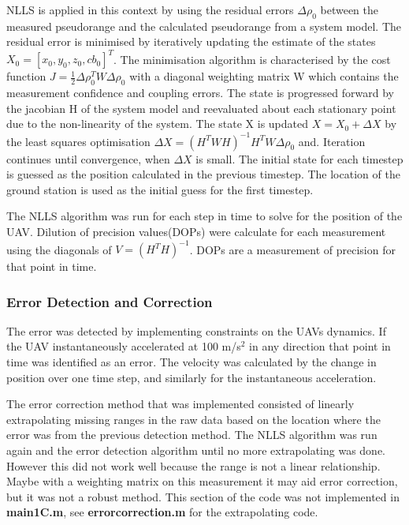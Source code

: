 \documentclass[Space3_Assign2]{subfile}
\begin{document}
NLLS is applied in this context by using the residual errors $\Delta\rho_0$ between the measured pseudorange and the calculated pseudorange from a system model. The residual error is minimised by iteratively updating the estimate of the states $X_0 = [x_0,y_0,z_0,cb_0]^T$. The minimisation algorithm is characterised by the cost function $J = \frac{1}{2}\Delta\rho_0^TW\Delta\rho_0$ with a diagonal weighting matrix W which contains the measurement confidence and coupling errors. The state is progressed forward by the jacobian H of the system model and reevaluated about each stationary point due to the non-linearity of the system. The state X is updated $X = X_0+\Delta X$ by the least squares optimisation $\Delta X = (H^TWH)^{-1}H^TW\Delta \rho_0$ and. Iteration continues until convergence, when $\Delta X$ is small. The initial state for each timestep is guessed as the position calculated in the previous timestep. The location of the ground station is used as the initial guess for the first timestep.

The NLLS algorithm was run for each step in time to solve for the position of the UAV. Dilution of precision values(DOPs) were calculate for each measurement using the diagonals of $V = (H^TH)^{-1}$. DOPs are a measurement of precision for that point in time. 

\subsubsection{Error Detection and Correction}
The error was detected by implementing constraints on the UAVs dynamics. If the UAV instantaneously accelerated at 100 m/s$^2$ in any direction that point in time was identified as an error. The velocity was calculated by the change in position over one time step, and similarly for the instantaneous acceleration. 

The error correction method that was implemented consisted of linearly extrapolating missing ranges in the raw data based on the location where the error was from the previous detection method. The NLLS algorithm was run again and the error detection algorithm until no more extrapolating was done. However this did not work well because the range is not a linear relationship. Maybe with a weighting matrix on this measurement it may aid error correction, but it was not a robust method. This section of the code was not implemented in \textbf{main1C.m}, see \textbf{errorcorrection.m} for the extrapolating code.
\end{document}
